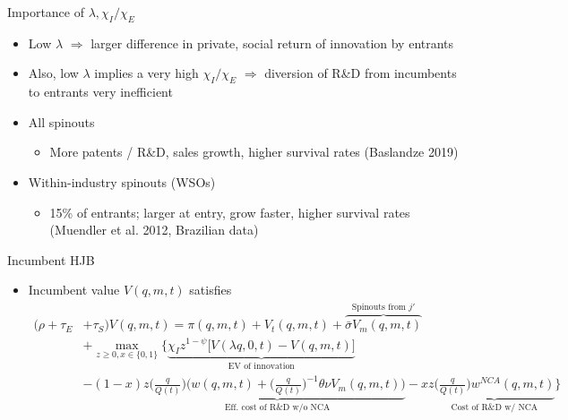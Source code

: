 \documentclass[english,usenames,dvipsnames]{beamer}
\begin{document}
\begin{frame}{Importance of $\lambda, \chi_I / \chi_E$}
\begin{itemize}
	\item Low $\lambda$ $\Rightarrow$ larger difference in private, social return of innovation by entrants
	\item Also, low $\lambda$ implies a very high $\chi_I / \chi_E$ $\Rightarrow$ diversion of R\&D from incumbents to entrants very inefficient
\end{itemize}
\end{frame}

\appendix



\begin{frame}\label{spinouts_facts_from_literature}
\hyperlink{motivation_spillovers}{}
\begin{itemize}
\item All spinouts
\begin{itemize}
\item More patents / R\&D, sales growth, higher survival rates (Baslandze 2019) 
\end{itemize}
\item Within-industry spinouts (WSOs)
\begin{itemize}
\item 15\% of entrants; larger at entry, grow faster, higher survival rates (Muendler et al. 2012, Brazilian data)
\end{itemize}
\end{itemize}
\end{frame}


\begin{frame}{Incumbent HJB}\label{HJB_incumbent}
\hyperlink{closing_the_model}{}
\begin{itemize}
\item Incumbent value $V(q,m,t)$ satisfies
\tiny
\begin{align*}
(\rho + \tau_E& + \tau_S) V(q,m,t) = \pi(q,m,t) + V_t(q,m,t) + \overbrace{\bar{\sigma}V_m(q,m,t)}^{\textrm{Spinouts from $j'$}}  \nonumber \\ 
&+ \max_{z \ge 0, x\in \{0,1\}} \Big\{ \underbrace{\chi_I z^{1-\psi} \Big[V(\lambda q,0,t) - V(q,m,t) \Big]}_{\textrm{EV of innovation}} \\
&-(1-x) z \underbrace{\Big(\frac{q}{Q(t)}\Big) \Big(  w(q,m,t) + \Big(\frac{q}{Q(t)}\Big)^{-1} \theta \nu V_m(q,m,t) \Big)}_{\textrm{Eff. cost of R\&D w/o NCA}} - xz \underbrace{\Big( \frac{q}{Q(t)} \Big) w^{NCA}(q,m,t)}_{\textrm{Cost of R\&D w/ NCA}} \Big\} 
\end{align*}
\end{itemize}
\end{frame}
\end{document}
